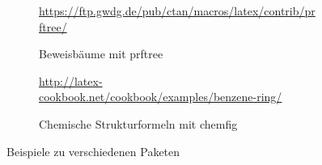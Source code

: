 \begin{figure}[p]
{\begin{subfigure}{\widefigurewidth}
		\end{subfigure}
		\colrules
		\begin{subfigure}[t]{\widefigurewidth}
			\caption{Beweisbäume mit prftree}
			\centering\tiny{\url{https://ftp.gwdg.de/pub/ctan/macros/latex/contrib/prftree/}}
			\label{fig:prftree-example}
		\end{subfigure}
		\hspace{\widefiguregap}
		\begin{subfigure}[t]{\widefigurewidth}
			\caption{Chemische Strukturformeln mit chemfig}
			\centering\tiny{\url{http://latex-cookbook.net/cookbook/examples/benzene-ring/}}
			\label{fig:chemfig-example}
		\end{subfigure}
		\medskip
	}
	\caption{Beispiele zu verschiedenen Paketen}
	\label{paket-beispiele}
\end{figure}


